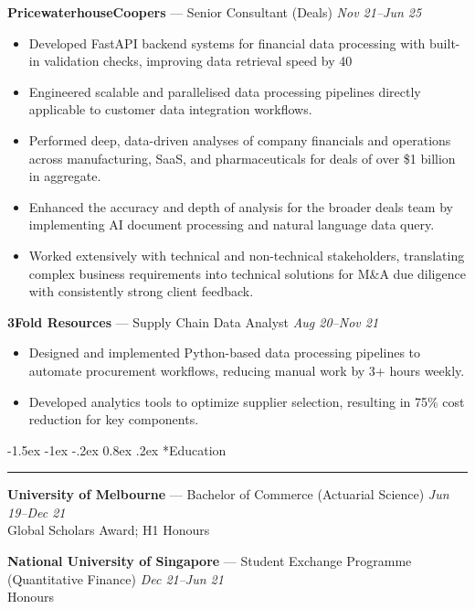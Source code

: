 \documentclass[10pt,letterpaper]{article}
\makeatletter
\renewcommand{\section}{\@startsection{section}{1}{\z@}%
  {-1.5ex \@plus -1ex \@minus -.2ex}%
  {0.8ex \@plus.2ex}%
  {\normalfont\large\bfseries}}
\makeatother
\begin{document}
\textbf{PricewaterhouseCoopers} — Senior Consultant (Deals) \hfill \textit{Nov 21--Jun 25}\vspace{-0.2em}
\begin{itemize}
  \item Developed FastAPI backend systems for financial data processing with built-in validation checks, improving data retrieval speed by 40%
  \item Engineered scalable and parallelised data processing pipelines directly applicable to customer data integration workflows.
  \item Performed deep, data-driven analyses of company financials and operations across manufacturing, SaaS, and pharmaceuticals for deals of over \$1 billion in aggregate.
  \item Enhanced the accuracy and depth of analysis for the broader deals team by implementing AI document processing and natural language data query.
  \item Worked extensively with technical and non-technical stakeholders, translating complex business requirements into technical solutions for M\&A due diligence with consistently strong client feedback.
\end{itemize}

\textbf{3Fold Resources} — Supply Chain Data Analyst \hfill \textit{Aug 20--Nov 21}\vspace{-0.2em}
\begin{itemize}
  \item Designed and implemented Python-based data processing pipelines to automate procurement workflows, reducing manual work by 3+ hours weekly.
  \item Developed analytics tools to optimize supplier selection, resulting in 75\% cost reduction for key components.
\end{itemize}

\section*{Education}
\hrule\vspace{0.3em}

\textbf{University of Melbourne} — Bachelor of Commerce (Actuarial Science) \hfill \textit{Jun 19--Dec 21}\\
Global Scholars Award; H1 Honours

\textbf{National University of Singapore} — Student Exchange Programme (Quantitative Finance) \hfill \textit{Dec 21--Jun 21}\\
Honours
\end{document}
